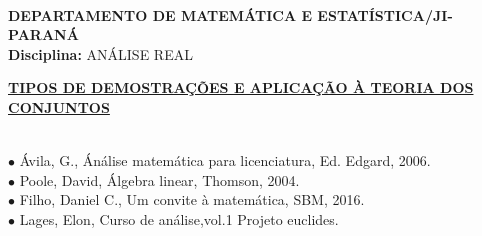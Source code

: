 \documentclass[10pt]{article}
\begin{document}
\\
{\bf DEPARTAMENTO DE MATEM\'{A}TICA E ESTAT\'ISTICA/JI-PARAN\'A}\\
{\bf Disciplina:} AN\'ALISE REAL \hspace{92pt}
\\

\begin{center}
{\large \bf \underline{TIPOS DE DEMOSTRAÇÕES E APLICAÇÃO À TEORIA DOS CONJUNTOS}}
\end{center}
\par{}\\
\noindent $\bullet$ Ávila, G., Ánálise matemática para licenciatura, Ed. Edgard, 2006.\\
          $\bullet$ Poole, David, Álgebra linear, Thomson, 2004.\\
          $\bullet$ Filho, Daniel C., Um convite à matemática, SBM, 2016.\\
          $\bullet$ Lages, Elon, Curso de análise,vol.1 Projeto euclides.\\
\end{document}
